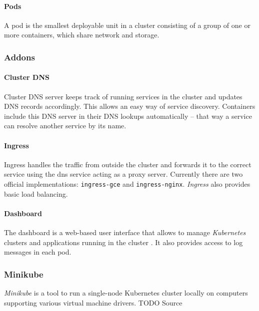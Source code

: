\paragraph{Pods}\label{pods}

A pod is the smallest deployable unit in a cluster consisting of a group
of one or more containers, which share network and storage.
\cite{kub-pod}

\subsubsection{Addons}\label{addons}

\paragraph{Cluster DNS}\label{cluster-dns}

Cluster DNS server keeps track of running services in the cluster and
updates DNS records accordingly. This allows an easy way of service
discovery. Containers include this DNS server in their DNS lookups
automatically -- that way a service can resolve another service by its
name. \cite{baier-kub}

\paragraph{Ingress}\label{ingress}

Ingress handles the traffic from outside the cluster and forwards it to
the correct service using the dns service acting as a proxy server.
Currently there are two official implementations: \texttt{ingress-gce}
and \texttt{ingress-nginx}. \emph{Ingress} also provides basic load
balancing. \cite{kub-ingress}

\paragraph{Dashboard}\label{dashboard}

The dashboard is a web-based user interface that allows to manage
\emph{Kubernetes} clusters and applications running in the cluster
\cite{kub_comp}. It also provides access to log messages in each pod.

\subsubsection{Minikube}\label{minikube}

\emph{Minikube} is a tool to run a single-node Kubernetes cluster
locally on computers supporting various virtual machine drivers. TODO
Source

